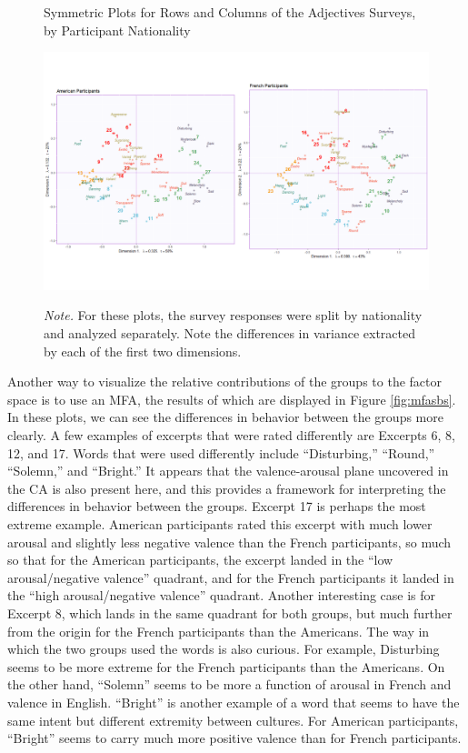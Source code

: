 \documentclass[
  english,
  man,floatsintext]{apa6}
\begin{document}
\begin{figure}   
  \centering  
  \caption{Symmetric Plots for Rows and Columns of the Adjectives Surveys, by Participant Nationality}
    \includegraphics{./Music-Descriptor-Space_files/figure-latex/factormapsA.png}
  \label{fig:factormapsA}
  \caption*{\footnotesize \textit{Note.}  For these plots, the survey responses were split by nationality and analyzed separately. Note the differences in variance extracted by each of the first two dimensions.}
\end{figure}

Another way to visualize the relative contributions of the groups to the factor space is to use an MFA, the results of which are displayed in Figure \ref{fig:mfasbs}. In these plots, we can see the differences in behavior between the groups more clearly. A few examples of excerpts that were rated differently are Excerpts 6, 8, 12, and 17. Words that were used differently include ``Disturbing,'' ``Round,'' ``Solemn,'' and ``Bright.'' It appears that the valence-arousal plane uncovered in the CA is also present here, and this provides a framework for interpreting the differences in behavior between the groups. Excerpt 17 is perhaps the most extreme example. American participants rated this excerpt with much lower arousal and slightly less negative valence than the French participants, so much so that for the American participants, the excerpt landed in the ``low arousal/negative valence'' quadrant, and for the French participants it landed in the ``high arousal/negative valence'' quadrant. Another interesting case is for Excerpt 8, which lands in the same quadrant for both groups, but much further from the origin for the French participants than the Americans. The way in which the two groups used the words is also curious. For example, Disturbing seems to be more extreme for the French participants than the Americans. On the other hand, ``Solemn'' seems to be more a function of arousal in French and valence in English. ``Bright'' is another example of a word that seems to have the same intent but different extremity between cultures. For American participants, ``Bright'' seems to carry much more positive valence than for French participants.
\end{document}
